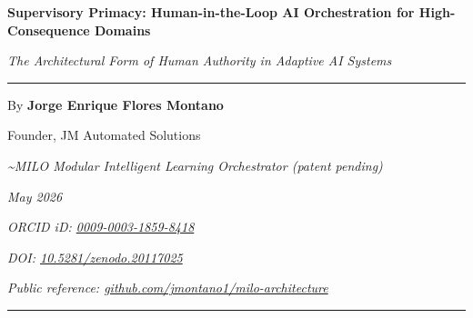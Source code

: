 \documentclass[11pt,letterpaper,oneside]{article}
\newcommand{\milotitle}{Supervisory Primacy: Human-in-the-Loop AI Orchestration for High-Consequence Domains}
\newcommand{\milosubtitle}{The Architectural Form of Human Authority in Adaptive AI Systems}
\newcommand{\milodate}{May 2026}
\begin{document}
\thispagestyle{titlepage}
\begin{center}
\vspace*{0.2in}
{\sffamily\Large\bfseries\color{milonavy} \milotitle\par}
\vspace{0.15in}
{\itshape\normalsize \milosubtitle\par}
\vspace{0.18in}
{\color{milonavy}\rule{0.35\textwidth}{0.8pt}\par}
\vspace{0.18in}
{\large By \textbf{Jorge Enrique Flores Montano}\par}
{\normalsize Founder, JM Automated Solutions\par}
{\small\itshape\textcolor{black!70}{\textasciitilde MILO\texttrademark{} \textemdash{} Modular Intelligent Learning Orchestrator (patent pending)}\par}
{\small\itshape\textcolor{black!70}{\milodate}\par}
{\small\itshape\textcolor{black!70}{ORCID iD: \href{https://orcid.org/0009-0003-1859-8418}{0009-0003-1859-8418}}\par}
{\small\itshape\textcolor{black!70}{DOI: \href{https://doi.org/10.5281/zenodo.20117025}{10.5281/zenodo.20117025}}\par}
{\small\itshape\textcolor{black!70}{Public reference: \href{https://github.com/jmontano1/milo-architecture}{github.com/jmontano1/milo-architecture}}\par}
\vspace{0.15in}
{\color{milonavy}\rule{\textwidth}{0.6pt}\par}
\end{center}


\end{document}
